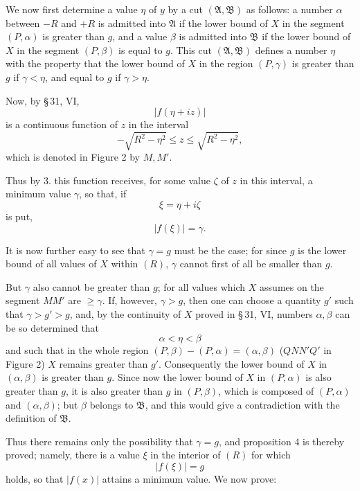 \documentclass[11pt]{article}
\begin{document}
We now first determine a value $\eta$ of $y$ by a cut $(\mathfrak A,\mathfrak B)$ as follows: a number $\alpha$ between $-R$ and $+R$ is admitted into $\mathfrak A$ if the lower bound of $X$ in the segment $(P,\alpha)$ is greater than $g$, and a value $\beta$ is admitted into $\mathfrak B$ if the lower bound of $X$ in the segment $(P,\beta)$ is equal to $g$. This cut $(\mathfrak A,\mathfrak B)$ defines a number $\eta$ with the property that the lower bound of $X$ in the region $(P,\gamma)$ is greater than $g$ if $\gamma<\eta$, and equal to $g$ if $\gamma>\eta$.

Now, by \S\,31, VI,
\[
 |f(\eta+iz)|
\]
is a continuous function of $z$ in the interval
\begin{equation}
 -\sqrt{R^2-\eta^2}\le z\le \sqrt{R^2-\eta^2},
\tag{8}
\end{equation}
which is denoted in Figure 2 by $M,M'$.

Thus by 3. this function receives, for some value $\zeta$ of $z$ in this interval, a minimum value $\gamma$, so that, if
\[
 \xi=\eta+i\zeta
\]
is put,
\begin{equation}
 |f(\xi)|=\gamma.
\tag{9}
\end{equation}

It is now further easy to see that $\gamma=g$ must be the case; for since $g$ is the lower bound of all values of $X$ within $(R)$, $\gamma$ cannot first of all be smaller than $g$.

But $\gamma$ also cannot be greater than $g$; for all values which $X$ assumes on the segment $MM'$ are $\ge\gamma$. If, however, $\gamma>g$, then one can choose a quantity $g'$ such that $\gamma>g'>g$, and, by the continuity of $X$ proved in \S\,31, VI, numbers $\alpha,\beta$ can be so determined that
\[
 \alpha<\eta<\beta
\]
and such that in the whole region $(P,\beta)-(P,\alpha)=(\alpha,\beta)$ ($QNN'Q'$ in Figure 2) $X$ remains greater than $g'$. Consequently the lower bound of $X$ in $(\alpha,\beta)$ is greater than $g$. Since now the lower bound of $X$ in $(P,\alpha)$ is also greater than $g$, it is also greater than $g$ in $(P,\beta)$, which is composed of $(P,\alpha)$ and $(\alpha,\beta)$; but $\beta$ belongs to $\mathfrak B$, and this would give a contradiction with the definition of $\mathfrak B$.

Thus there remains only the possibility that $\gamma=g$, and proposition 4 is thereby proved; namely, there is a value $\xi$ in the interior of $(R)$ for which
\[
 |f(\xi)|=g
\]
holds, so that $|f(x)|$ attains a minimum value. We now prove:
\end{document}
